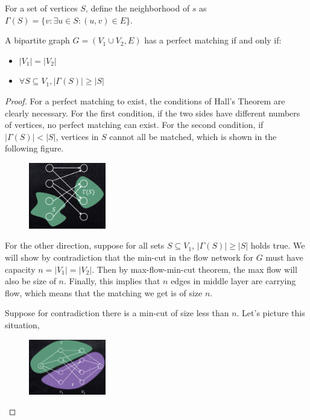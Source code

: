 For a set of vertices $S$, define the neighborhood of $s$ as $\Gamma(S) = \{v: \exists u \in S: (u, v) \in E\}$.
\begin{theorem}
	A bipartite graph $G=(V_1 \cup V_2, E)$ has a perfect matching if and only if:
	\begin{itemize}
		\item $|V_1| = |V_2|$
		\item $\forall S \subseteq V_1, |\Gamma(S)| \ge |S|$
	\end{itemize}
\end{theorem}

\begin{proof}
	For a perfect matching to exist, the conditions of Hall's Theorem are clearly necessary. For the first condition, if the two sides have different numbers of vertices, no perfect matching can exist. For the second condition, if $|\Gamma(S)| < |S|$, vertices in $S$ cannot all be matched, which is shown in the following figure.
	\begin{figure}[H]
		\centering
		\includegraphics[width=0.3\textwidth]{fig/hall-theorem.png}
	\end{figure} 

	For the other direction, suppose for all sets $S \subseteq V_1$, $|\Gamma(S)| \ge |S|$ holds true. We will show by contradiction that the min-cut in the flow network for $G$ must have capacity $n = |V_1| = |V_2|$. Then by max-flow-min-cut theorem, the max flow will also be size of $n$. Finally, this implies that $n$ edges in middle layer are carrying flow, which means that the matching we get is of size $n$.
	
	Suppose for contradiction there is a min-cut of size less than $n$. Let's picture this situation,
	\begin{figure}[H]
	\centering
	\includegraphics[width=0.3\textwidth]{fig/hall-theorem-proof.png}
	\end{figure} 	
	

\end{proof}
